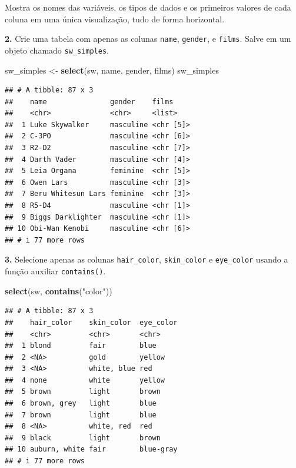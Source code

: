 \documentclass[
]{book}
\newenvironment{Shaded}{\begin{snugshade}}{\end{snugshade}}
\newcommand{\FunctionTok}[1]{\textcolor[rgb]{0.13,0.29,0.53}{\textbf{#1}}}
\newcommand{\NormalTok}[1]{#1}
\newcommand{\OtherTok}[1]{\textcolor[rgb]{0.56,0.35,0.01}{#1}}
\newcommand{\StringTok}[1]{\textcolor[rgb]{0.31,0.60,0.02}{#1}}
\begin{document}
Mostra os nomes das variáveis, os tipos de dados e os primeiros valores
de cada coluna em uma única visualização, tudo de forma horizontal.

\textbf{2.} Crie uma tabela com apenas as colunas \texttt{name}, \texttt{gender}, e
\texttt{films}. Salve em um objeto chamado \texttt{sw\_simples}.

\begin{Shaded}
\begin{Highlighting}[]
\NormalTok{sw\_simples }\OtherTok{\textless{}{-}} \FunctionTok{select}\NormalTok{(sw, name, gender, films)}
\NormalTok{sw\_simples}
\end{Highlighting}
\end{Shaded}

\begin{verbatim}
## # A tibble: 87 x 3
##    name               gender    films    
##    <chr>              <chr>     <list>   
##  1 Luke Skywalker     masculine <chr [5]>
##  2 C-3PO              masculine <chr [6]>
##  3 R2-D2              masculine <chr [7]>
##  4 Darth Vader        masculine <chr [4]>
##  5 Leia Organa        feminine  <chr [5]>
##  6 Owen Lars          masculine <chr [3]>
##  7 Beru Whitesun Lars feminine  <chr [3]>
##  8 R5-D4              masculine <chr [1]>
##  9 Biggs Darklighter  masculine <chr [1]>
## 10 Obi-Wan Kenobi     masculine <chr [6]>
## # i 77 more rows
\end{verbatim}

\textbf{3.} Selecione apenas as colunas \texttt{hair\_color}, \texttt{skin\_color} e
\texttt{eye\_color} usando a função auxiliar \texttt{contains()}.

\begin{Shaded}
\begin{Highlighting}[]
\FunctionTok{select}\NormalTok{(sw, }\FunctionTok{contains}\NormalTok{(}\StringTok{"color"}\NormalTok{))}
\end{Highlighting}
\end{Shaded}

\begin{verbatim}
## # A tibble: 87 x 3
##    hair_color    skin_color  eye_color
##    <chr>         <chr>       <chr>    
##  1 blond         fair        blue     
##  2 <NA>          gold        yellow   
##  3 <NA>          white, blue red      
##  4 none          white       yellow   
##  5 brown         light       brown    
##  6 brown, grey   light       blue     
##  7 brown         light       blue     
##  8 <NA>          white, red  red      
##  9 black         light       brown    
## 10 auburn, white fair        blue-gray
## # i 77 more rows
\end{verbatim}
\end{document}
